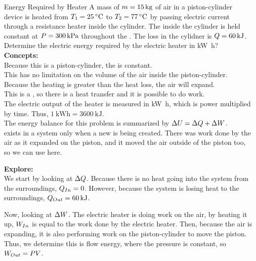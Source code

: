 \begin{example}{Energy Required by Heater}
  A mass of $m = \SI{15}{\kilo\gram}$ of air in a piston-cylinder device is heated from $\Temp_{1} = \SI{25}{\degreeCelsius}$ to $\Temp_{2} = \SI{77}{\degreeCelsius}$ by passing electric current through a resistance heater inside the cylinder.
  The  inside the cylinder is held constant at $P = \SI{300}{\kilo\pascal}$ throughout the .
  The  loss in the cylidner is $Q = \SI{60}{\kilo\joule}$.
  Determine the electric energy required by the electric heater in \si{\kilo\watt\hour}?
  \tcblower{}
  \textbf{Concepts:} \\
  Because this is a piston-cylinder, the  is constant. \\
  This has no limitation on the volume of the air inside the piston-cylinder.
  Because the heating is greater than the heat loss, the air will expand. \\
  This is a , so there is a heat transfer and it is possible to do work. \\
  The electric output of the heater is measured in \si{\kilo\watt\hour}, which is power multiplied by time.
  Thus, $\SI{1}{\kilo\watt\hour} = \SI{3600}{\kilo\joule}$. \\
  The energy balance for this problem is summarized by $\Delta U = \Delta Q + \Delta W$. \\
   exists in a system only when a new  is being created.
  There was work done by the air as it expanded on the piston, and it moved the air outside of the piston too, so we can use  here.

  \textbf{Explore:} \\
  We start by looking at $\Delta Q$.
  Because there is no heat going into the system from the surroundings, $Q_{In} = 0$.
  However, because the system is losing heat to the surroundings, $Q_{Out} = \SI{60}{\kilo\joule}$.

  Now, looking at $\Delta W$.
  The electric heater is doing work on the air, by heating it up, $W_{In}$ is equal to the work done by the electric heater.
  Then, because the air is expanding, it is also performing work on the piston-cylinder to move the piston.
  Thus, we determine this is flow energy, where the pressure is constant, so $W_{Out} = P V$.


\end{example}
